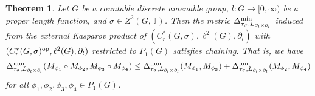 \documentclass[11pt, a4paper, oneside, final, reqno]{amsart}
\newcommand{\bbT}{\mathbb{T}}
\newcommand{\Cred}{C^*_r}
\theoremstyle{definition}
\theoremstyle{plain}
\newtheorem{theorem}[definition]{Theorem}
\theoremstyle{remark}
\numberwithin{equation}{section}
\begin{document}
\begin{theorem}\label{thm:chaining 3}
    Let $G$ be a countable discrete amenable group, $l \colon G \to [0,\infty)$ be a proper length function, and $\sigma \in Z^2(G,\bbT)$. Then the metric $\Delta_{\tau_\sigma,L_{\partial_l \times \partial_l}}^{\rm min}$ induced from the external Kasparov product of $(\Cred(G,\sigma), \ell^2(G), \partial_l)$ with $(\Cred(G,\sigma)^{\rm op}, \ell^2(G), \partial_l)$ restricted to $P_{1}(G)$ satisfies chaining. That is, we have
    \begin{align*}
       \Delta_{\tau_\sigma,L_{\partial_l \times \partial_l}}^{\rm min} (M_{\phi_{1}} \circ M_{\phi_{2}}, M_{\phi_{3}} \circ M_{\phi_{4}})
       \leq \Delta_{\tau_\sigma,L_{\partial_l \times \partial_l}}^{\rm min}(M_{\phi_{1}}, M_{\phi_{3}}) + \Delta_{\tau_\sigma,L_{\partial_l \times \partial_l}}^{\rm min}(M_{\phi_{2}}, M_{\phi_{4}})
    \end{align*}
    for all $\phi_1, \phi_2, \phi_3, \phi_4 \in P_1(G)$.
\end{theorem}
\end{document}
